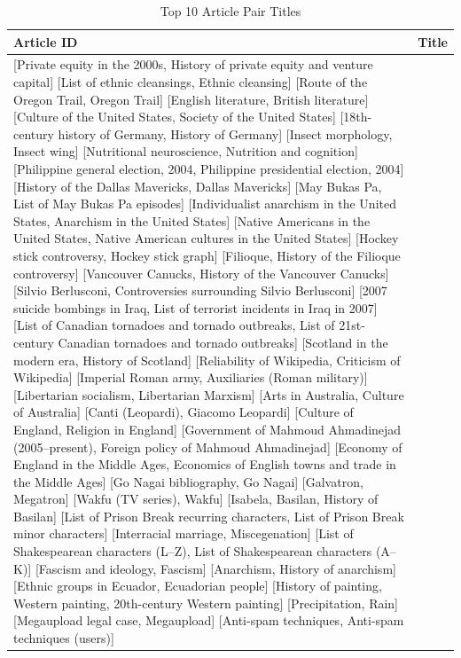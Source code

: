 \documentclass{acm_proc_article-sp}
\begin{document}
\begin{table}
\centering
\caption{Top 10 Article Pair Titles}
\begin{tabular}{| l | c |}
    \hline
    \textbf{Article ID} & \textbf{Title} \\ \hline
[Early life and career of Marcus Aurelius, Marcus Aurelius]
[Private equity in the 2000s, History of private equity and venture capital]
[List of ethnic cleansings, Ethnic cleansing]
[Route of the Oregon Trail, Oregon Trail]
[English literature, British literature]
[Culture of the United States, Society of the United States]
[18th-century history of Germany, History of Germany]
[Insect morphology, Insect wing]
[Nutritional neuroscience, Nutrition and cognition]
[Philippine general election, 2004, Philippine presidential election, 2004]
[History of the Dallas Mavericks, Dallas Mavericks]
[May Bukas Pa, List of May Bukas Pa episodes]
[Individualist anarchism in the United States, Anarchism in the United States]
[Native Americans in the United States, Native American cultures in the United States]
[Hockey stick controversy, Hockey stick graph]
[Filioque, History of the Filioque controversy]
[Vancouver Canucks, History of the Vancouver Canucks]
[Silvio Berlusconi, Controversies surrounding Silvio Berlusconi]
[2007 suicide bombings in Iraq, List of terrorist incidents in Iraq in 2007]
[List of Canadian tornadoes and tornado outbreaks, List of 21st-century Canadian tornadoes and tornado outbreaks]
[Scotland in the modern era, History of Scotland]
[Reliability of Wikipedia, Criticism of Wikipedia]
[Imperial Roman army, Auxiliaries (Roman military)]
[Libertarian socialism, Libertarian Marxism]
[Arts in Australia, Culture of Australia]
[Canti (Leopardi), Giacomo Leopardi]
[Culture of England, Religion in England]
[Government of Mahmoud Ahmadinejad (2005–present), Foreign policy of Mahmoud Ahmadinejad]
[Economy of England in the Middle Ages, Economics of English towns and trade in the Middle Ages]
[Go Nagai bibliography, Go Nagai]
[Galvatron, Megatron]
[Wakfu (TV series), Wakfu]
[Isabela, Basilan, History of Basilan]
[List of Prison Break recurring characters, List of Prison Break minor characters]
[Interracial marriage, Miscegenation]
[List of Shakespearean characters (L–Z), List of Shakespearean characters (A–K)]
[Fascism and ideology, Fascism]
[Anarchism, History of anarchism]
[Ethnic groups in Ecuador, Ecuadorian people]
[History of painting, Western painting, 20th-century Western painting]
[Precipitation, Rain]
[Megaupload legal case, Megaupload]
[Anti-spam techniques, Anti-spam techniques (users)]

\end{tabular}
\end{table}
\end{document}
